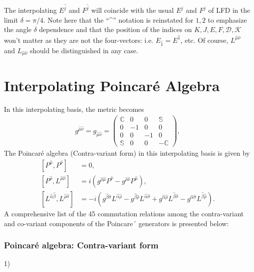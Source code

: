 \documentclass[12pt,a4paper]{report}
\newcommand{\muT}{\hat{\mu}}
\newcommand{\nuT}{\hat{\nu}}
\newcommand{\itP}[1]{\hat{#1}}
\begin{document}
The interpolating $E^{\itP{j}}$ and $F^{\itP{j}}$ will coincide with the usual $E^{j}$ and $F^{j}$ of LFD in the limit $\delta=\pi/4$.
Note here that the ``\textasciicircum'' notation is reinstated for $1, 2$ to emphasize the angle $\delta$ dependence and that the position of the indices on $K, J, E, F, \mathcal{D}, \mathcal{K}$ won't matter as they are not the four-vectors: i.e. $E_{\itP{1}}=E^{\itP{1}}$, etc. Of course, $L^{\muT\nuT}$ and $L_{\muT\nuT}$ should be distinguished in any case.
\section{Interpolating Poincaré Algebra}
In this interpolating basis, the metric becomes
\begin{align}\label{eqn:g_munu_interpolation}
  g^{\hat{\mu}\hat{\nu}}
  = g_{\hat{\mu}\hat{\nu}}
  =
  \begin{pmatrix}
    \mathbb{C} & 0  & 0  & \mathbb{S} \\
    0 & -1 & 0  & 0 \\
    0 & 0  & -1 & 0 \\
    \mathbb{S} & 0  & 0  & -\mathbb{C}
  \end{pmatrix},
\end{align}
The Poincaré algebra (Contra-variant form) in this interpolating basis is given by
\begin{align}
    \left[P^{\hat{\mu}},P^{\hat{\nu}}\right]&=0,\nonumber\\
    \left[P^{\hat{\rho}},L^{\hat{\mu}\hat{\nu}}\right]&=i\left(g^{\hat{\rho}\hat{\mu}}P^{\hat{\nu}}-g^{\hat{\rho}\hat{\nu}}P^{\hat{\mu}}\right),\nonumber\\
    \left[L^{\hat{\alpha}\hat{\beta}},L^{\hat{\rho}\hat{\sigma}}\right]&=-i\left(g^{\hat{\beta}\hat{\sigma}}L^{\hat{\alpha}\hat{\rho}}-g^{\hat{\beta}\hat{\rho}}L^{\hat{\alpha}\hat{\sigma}}+g^{\hat{\alpha}\hat{\rho}}L^{\hat{\beta}\hat{\sigma}}-g^{\hat{\alpha}\hat{\sigma}}L^{\hat{\beta}\hat{\rho}}\right).
\end{align}
A comprehensive list of the 45 commutation relations among the contra-variant and co-variant components of the Poincare´ generators is presented below: \cite{poin}
\subsubsection{Poincaré algebra: Contra-variant form}
1) 
\end{document}
